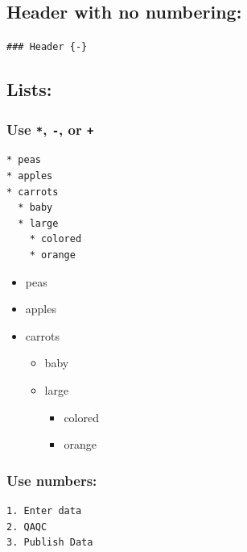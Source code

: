 \documentclass[
]{book}
\providecommand{\tightlist}{%
  \setlength{\itemsep}{0pt}\setlength{\parskip}{0pt}}
\begin{document}
\hypertarget{header-with-no-numbering}{%
\subsection*{Header with no numbering:}\label{header-with-no-numbering}}

\texttt{\#\#\#\ Header\ \{-\}}

\hypertarget{lists}{%
\subsection{Lists:}\label{lists}}

\hypertarget{use---or}{%
\subsubsection{\texorpdfstring{Use \texttt{*}, \texttt{-}, or \texttt{+}}{Use *, -, or +}}\label{use---or}}

\begin{verbatim}
* peas
* apples
* carrots
  * baby
  * large
    * colored
    * orange
\end{verbatim}

\begin{itemize}
\tightlist
\item
  peas
\item
  apples
\item
  carrots

  \begin{itemize}
  \tightlist
  \item
    baby
  \item
    large

    \begin{itemize}
    \tightlist
    \item
      colored
    \item
      orange
    \end{itemize}
  \end{itemize}
\end{itemize}

\hypertarget{use-numbers}{%
\subsubsection{Use numbers:}\label{use-numbers}}

\begin{verbatim}
1. Enter data
2. QAQC
3. Publish Data  
\end{verbatim}
\end{document}
